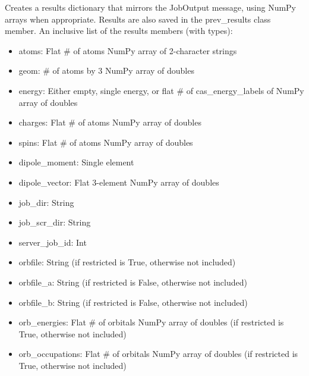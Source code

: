\documentclass[letterpaper,10pt,english]{sphinxmanual}
\begin{document}
\begin{fulllineitems}
\begin{fulllineitems}
Creates a results dictionary that mirrors the JobOutput message, using NumPy arrays when appropriate.
Results are also saved in the prev\_results class member.
An inclusive list of the results members (with types):
\begin{itemize}
\item {} 
atoms:              Flat \# of atoms NumPy array of 2-character strings

\item {} 
geom:               \# of atoms by 3 NumPy array of doubles

\item {} 
energy:             Either empty, single energy, or flat \# of cas\_energy\_labels of NumPy array of doubles

\item {} 
charges:            Flat \# of atoms NumPy array of doubles

\item {} 
spins:              Flat \# of atoms NumPy array of doubles

\item {} 
dipole\_moment:      Single element

\item {} 
dipole\_vector:      Flat 3-element NumPy array of doubles

\item {} 
job\_dir:            String

\item {} 
job\_scr\_dir:        String

\item {} 
server\_job\_id:      Int

\item {} 
orbfile:            String (if restricted is True, otherwise not included)

\item {} 
orbfile\_a:          String (if restricted is False, otherwise not included)

\item {} 
orbfile\_b:          String (if restricted is False, otherwise not included)

\item {} 
orb\_energies:       Flat \# of orbitals NumPy array of doubles (if restricted is True, otherwise not included)

\item {} 
orb\_occupations:    Flat \# of orbitals NumPy array of doubles (if restricted is True, otherwise not included)


\end{itemize}
\end{fulllineitems}
\end{fulllineitems}
\end{document}

